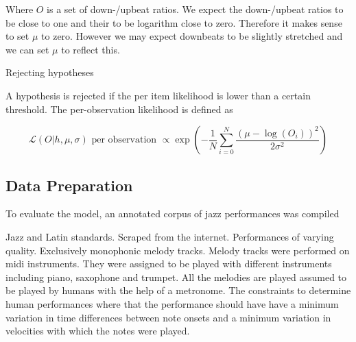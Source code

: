 Where $O$ is a set of down-/upbeat ratios. We expect the down-/upbeat ratios to be close to one and their to be logarithm close to zero. Therefore it makes sense to set $\mu$ to zero. However we may expect downbeats to be slightly stretched and we can set $\mu$ to reflect this.

Rejecting hypotheses

A hypothesis is rejected if the per item likelihood is lower than a certain threshold. The per-observation likelihood is defined as

\begin{equation}
\label{eq:per_obs_likelihood}
\mathcal{L}(O|h, \mu, \sigma) \mbox{ per observation } \propto \exp\left(-\frac{1}{N}\sum_{i=0}^N \frac{(\mu - \log(O_i))^2}{2\sigma^2}\right)
\end{equation}









\subsection{Data Preparation}

To evaluate the model, an annotated corpus of jazz performances was compiled

Jazz and Latin standards. Scraped from the internet. Performances of varying quality. Exclusively monophonic melody tracks. Melody tracks were performed on midi instruments. They were assigned to be played with different instruments including piano, saxophone and trumpet. All the melodies are played assumed to be played by humans with the help of a metronome. The constraints to determine human performances where that the performance should have have a minimum variation in time differences between note onsets and a minimum variation in velocities with which the notes were played.

